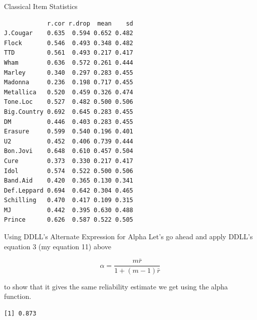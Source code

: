 \documentclass[
  ignorenonframetext,
]{beamer}
\newenvironment{Shaded}{\begin{snugshade}}{\end{snugshade}}
\newcommand{\DecValTok}[1]{\textcolor[rgb]{0.00,0.00,0.81}{#1}}
\newcommand{\FunctionTok}[1]{\textcolor[rgb]{0.00,0.00,0.00}{#1}}
\newcommand{\NormalTok}[1]{#1}
\newcommand{\OtherTok}[1]{\textcolor[rgb]{0.56,0.35,0.01}{#1}}
\newcommand{\SpecialCharTok}[1]{\textcolor[rgb]{0.00,0.00,0.00}{#1}}
\begin{document}
\begin{frame}[fragile]{Classical Item Statistics}
\protect\hypertarget{classical-item-statistics}{}
\begin{verbatim}
            r.cor r.drop  mean    sd
J.Cougar    0.635  0.594 0.652 0.482
Flock       0.546  0.493 0.348 0.482
TTD         0.561  0.493 0.217 0.417
Wham        0.636  0.572 0.261 0.444
Marley      0.340  0.297 0.283 0.455
Madonna     0.236  0.198 0.717 0.455
Metallica   0.520  0.459 0.326 0.474
Tone.Loc    0.527  0.482 0.500 0.506
Big.Country 0.692  0.645 0.283 0.455
DM          0.446  0.403 0.283 0.455
Erasure     0.599  0.540 0.196 0.401
U2          0.452  0.406 0.739 0.444
Bon.Jovi    0.648  0.610 0.457 0.504
Cure        0.373  0.330 0.217 0.417
Idol        0.574  0.522 0.500 0.506
Band.Aid    0.420  0.365 0.130 0.341
Def.Leppard 0.694  0.642 0.304 0.465
Schilling   0.470  0.417 0.109 0.315
MJ          0.442  0.395 0.630 0.488
Prince      0.626  0.587 0.522 0.505
\end{verbatim}
\end{frame}

\begin{frame}[fragile]{Using DDLL's Alternate Expression for Alpha}
\protect\hypertarget{using-ddlls-alternate-expression-for-alpha}{}
Let's go ahead and apply DDLL's equation 3 (my equation 11) above

\[\alpha=\frac{m\bar{r}}{1+(m-1)\bar{r}}\]

to show that it gives the same reliability estimate we get using the
alpha function.

\begin{Shaded}
\end{Shaded}

\begin{verbatim}
[1] 0.873
\end{verbatim}
\end{frame}
\end{document}
